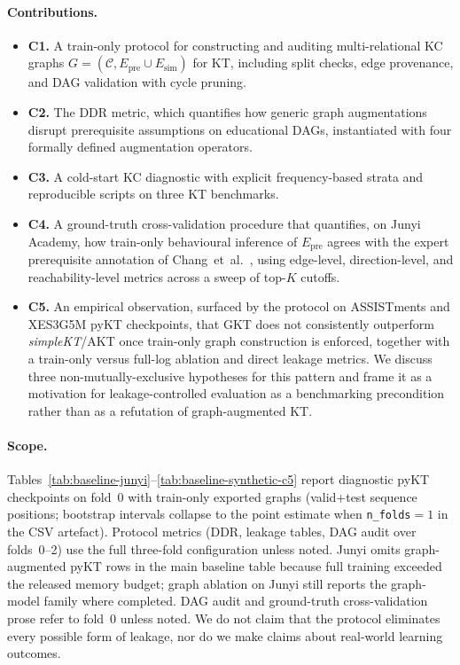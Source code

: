 \documentclass[runningheads]{llncs}
\newcommand{\Epre}{\ensuremath{E_{\text{pre}}}}
\newcommand{\Esim}{\ensuremath{E_{\text{sim}}}}
\newcommand{\DDR}{\textsc{DDR}}
\begin{document}
\paragraph{Contributions.}
\begin{itemize}
  \item \textbf{C1.} A train-only protocol for constructing and auditing
  multi-relational KC graphs
  $G=(\mathcal{C}, \Epre \cup \Esim)$ for KT, including split checks,
  edge provenance, and DAG validation with cycle pruning.
  \item \textbf{C2.} The \DDR{} metric, which quantifies how generic
  graph augmentations disrupt prerequisite assumptions on educational
  DAGs, instantiated with four formally defined augmentation operators.
  \item \textbf{C3.} A cold-start KC diagnostic with explicit
  frequency-based strata and reproducible scripts on three KT
  benchmarks.
  \item \textbf{C4.} A ground-truth cross-validation procedure that
  quantifies, on Junyi Academy, how train-only behavioural inference of
  $\Epre$ agrees with the expert prerequisite annotation of
  Chang~et~al.~\cite{junyi_dataset}, using edge-level, direction-level,
  and reachability-level metrics across a sweep of top-$K$ cutoffs.
  \item \textbf{C5.} An empirical observation, surfaced by the protocol
  on ASSISTments and XES3G5M pyKT checkpoints, that GKT does not
  consistently outperform \textit{simpleKT}/AKT once train-only graph
  construction is enforced, together with a train-only versus full-log
  ablation and direct leakage metrics. We discuss three
  non-mutually-exclusive hypotheses for this pattern and frame it as a
  motivation for leakage-controlled evaluation as a benchmarking
  precondition rather than as a refutation of graph-augmented KT.
\end{itemize}
\paragraph{Scope.}
Tables~\ref{tab:baseline-junyi}--\ref{tab:baseline-synthetic-c5} report diagnostic
pyKT checkpoints on fold~0 with train-only exported graphs (valid+test
sequence positions; bootstrap intervals collapse to the point estimate
when \texttt{n\_folds}${=}1$ in the CSV artefact). Protocol metrics
(\DDR{}, leakage tables, DAG audit over folds~0--2) use the full
three-fold configuration unless noted. Junyi omits graph-augmented pyKT
rows in the main baseline table because full training exceeded the
released memory budget; graph ablation on Junyi still reports the
graph-model family where completed. DAG audit and ground-truth
cross-validation prose refer to fold~0 unless noted.
We do not claim that the protocol eliminates
every possible form of leakage, nor do we make claims about real-world
learning outcomes.
\end{document}

